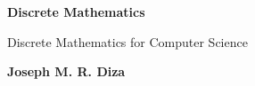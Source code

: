 \begin{titlepage}
    \begin{center}
        \vspace*{1cm}
            
        \Huge
        \textbf{Discrete Mathematics}
            
        \vspace{0.5cm}
        \LARGE
        Discrete Mathematics for Computer Science
            
        \vspace{1.5cm}
            
        \textbf{Joseph M. R. Diza}
            
        \vfill
            
    \end{center}
\end{titlepage}
